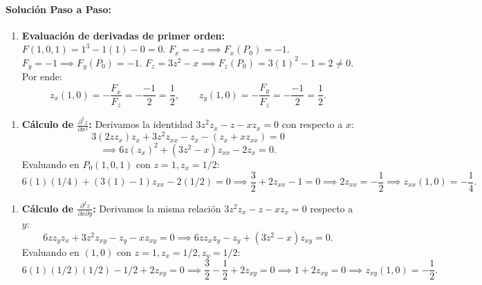 \documentclass[11pt,a4paper]{article}
\begin{document}
\paragraph{Solución Paso a Paso:}\par
\begin{enumerate}[label=\textbf{\arabic*.}]
\item \textbf{Evaluación de derivadas de primer orden:}
$F(1,0,1) = 1^3 - 1(1) - 0 = 0$.
$F_x = -z \implies F_x(P_0) = -1$.
$F_y = -1 \implies F_y(P_0) = -1$.
$F_z = 3z^2 - x \implies F_z(P_0) = 3(1)^2 - 1 = 2 \neq 0$.
Por ende:
\begin{equation*}
z_x(1,0) = -\frac{F_x}{F_z} = -\frac{-1}{2} = \frac{1}{2}, \qquad z_y(1,0) = -\frac{F_y}{F_z} = -\frac{-1}{2} = \frac{1}{2}.
\end{equation*}
\end{enumerate}

\begin{enumerate}[label=\textbf{\arabic*.}]
\item \textbf{Cálculo de $\frac{\partial^2 z}{\partial x^2}$:}
Derivamos la identidad $3z^2 z_x - z - x z_x = 0$ con respecto a $x$:
\begin{equation*}
3(2z z_x) z_x + 3z^2 z_{xx} - z_x - (z_x + x z_{xx}) = 0
\end{equation*}
\begin{equation*}
\implies 6z (z_x)^2 + (3z^2 - x) z_{xx} - 2z_x = 0.
\end{equation*}
Evaluando en $P_0(1,0,1)$ con $z=1, z_x = 1/2$:
\begin{equation*}
6(1)(1/4) + (3(1) - 1) z_{xx} - 2(1/2) = 0 \implies \frac{3}{2} + 2 z_{xx} - 1 = 0 \implies 2 z_{xx} = -\frac{1}{2} \implies z_{xx}(1,0) = -\frac{1}{4}.
\end{equation*}
\end{enumerate}

\begin{enumerate}[label=\textbf{\arabic*.}]
\item \textbf{Cálculo de $\frac{\partial^2 z}{\partial x \partial y}$:}
Derivamos la misma relación $3z^2 z_x - z - x z_x = 0$ respecto a $y$:
\begin{equation*}
6z z_y z_x + 3z^2 z_{xy} - z_y - x z_{xy} = 0 \implies 6z z_x z_y - z_y + (3z^2 - x) z_{xy} = 0.
\end{equation*}
Evaluando en $(1,0)$ con $z=1, z_x = 1/2, z_y = 1/2$:
\begin{equation*}
6(1)(1/2)(1/2) - 1/2 + 2 z_{xy} = 0 \implies \frac{3}{2} - \frac{1}{2} + 2 z_{xy} = 0 \implies 1 + 2 z_{xy} = 0 \implies z_{xy}(1,0) = -\frac{1}{2}.
\end{equation*}
\end{enumerate}
\end{document}
